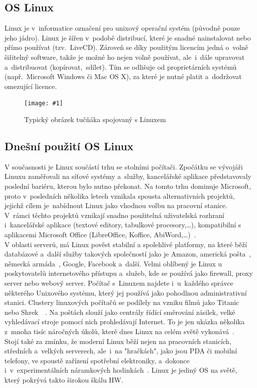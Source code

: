 \documentclass[a4paper,12pt]{article}
\newcommand{\obr}[3]{%
	\begin{figure}[h]
	\center\texttt{[image: \#1]}
	\caption{#3}
	\end{figure}
	}
\begin{document}
\subsection{OS Linux}
Linux je v~informatice označení pro unixový operační systém (původně pouze jeho jádro). Linux je šířen v~podobě distribucí, které je snadné nainstalovat nebo přímo používat (tzv.~LiveCD). Zároveň se díky použitým licencím jedná o~volně šiřitelný software, takže je možné ho nejen volně používat, ale~i~dále upravovat a~distribuovat (kopírovat,~sdílet). Tím se odlišuje od proprietárních systémů (např.~Microsoft Windows či Mac OS X), za které je nutné platit a~dodržovat omezující licence.~\cite{WLinux}
\obr{./img/Linux_logo.png}{0.3}{Typický obrázek tučňáka spojovaný s Linuxem}

\subsection{Dnešní použití OS Linux}
V současnosti je Linux součástí trhu se stolními počítači. Zpočátku se vývojáři Linuxu zaměřovali na síťové systémy a~služby, kancelářské aplikace představovaly poslední bariéru, kterou bylo nutno překonat. Na tomto trhu dominuje Microsoft, proto v~posledních několika letech vznikala spousta alternativních projektů, jejichž cílem je~nabídnout Linux jako vhodnou volbu na pracovní stanice. V~rámci těchto projektů vznikají snadno použitelná uživatelská rozhraní i~kancelářské aplikace (textové editory, tabulkové procesory,…), kompatibilní s aplikacemi Microsoft Office (LibreOffice, Koffice, AbiWord,…)~\cite{LDP}.\\
V oblasti serverů, má Linux pověst stabilní a spolehlivé platformy, na které běží databázové a~další služby takových společností jako je Amazon, americká pošta~\cite{AmericanPostLinux}, německá armáda~\cite{GermanArmyNoLinux}, Google, Facebook a~další. Velmi oblíbený je Linux u poskytovatelů internetového přístupu a~služeb, kde se používá jako firewall, proxy server nebo webový server. Počítač s~Linuxem najdete i~u~každého správce některého Unixového systému, který jej používá jako pohodlnou administrativní stanici. Clustery linuxových počítačů se podílely na vzniku filmů jako Titanic~\cite{TitanicLinux} nebo Shrek~\cite{Shrek2Linux}~\cite{Shrek3Linux}. Na poštách slouží jako centrály řídící směrování zásilek, velké vyhledávací stroje pomocí nich prohledávají Internet. To je jen ukázka několika z~mnoha tisíc náročných úkolů, které dnes Linux na celém světě vykonává~\cite{LDP}.\\
Stojí také za zmínku, že moderní Linux běží nejen na pracovních stanicích, středních a~velkých serverech, ale~i~na "hračkách", jako jsou PDA či mobilní telefony, ve spoustě zařízení spotřební elektroniky, a~dokonce i~v~experimentálních náramkových hodinkách~\cite{LinuxHodinky}. Linux je jediný OS na světě, který pokrývá takto širokou škálu HW.~\cite{LDP}
\end{document}
